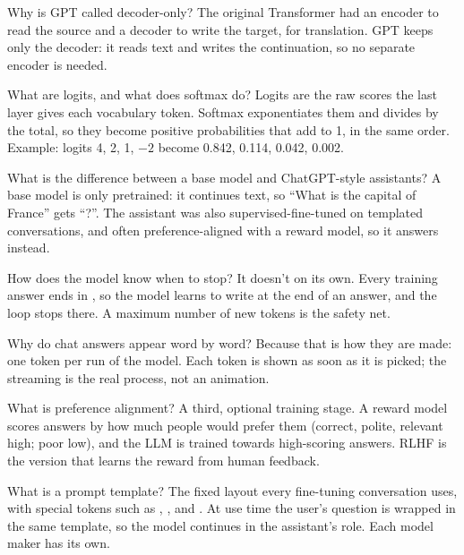 \begin{iq}[\core]{Why is GPT called decoder-only?}
The original Transformer had an encoder to read the source and a decoder to write the target, for translation. GPT keeps only the decoder: it reads text and writes the continuation, so no separate encoder is needed.
\end{iq}

\begin{iq}[\core]{What are logits, and what does softmax do?}
Logits are the raw scores the last layer gives each vocabulary token. Softmax exponentiates them and divides by the total, so they become positive probabilities that add to 1, in the same order. Example: logits 4, 2, 1, $-2$ become 0.842, 0.114, 0.042, 0.002.
\end{iq}

\begin{iq}[\core]{What is the difference between a base model and ChatGPT-style assistants?}
A base model is only pretrained: it continues text, so ``What is the capital of France'' gets ``?''. The assistant was also supervised-fine-tuned on templated conversations, and often preference-aligned with a reward model, so it answers instead.
\end{iq}

\begin{iq}{How does the model know when to stop?}
It doesn't on its own. Every training answer ends in , so the model learns to write  at the end of an answer, and the loop stops there. A maximum number of new tokens is the safety net.
\end{iq}

\begin{iq}{Why do chat answers appear word by word?}
Because that is how they are made: one token per run of the model. Each token is shown as soon as it is picked; the streaming is the real process, not an animation.
\end{iq}

\begin{iq}{What is preference alignment?}
A third, optional training stage. A reward model scores answers by how much people would prefer them (correct, polite, relevant high; poor low), and the LLM is trained towards high-scoring answers. RLHF is the version that learns the reward from human feedback.
\end{iq}

\begin{iq}{What is a prompt template?}
The fixed layout every fine-tuning conversation uses, with special tokens such as , ,  and . At use time the user's question is wrapped in the same template, so the model continues in the assistant's role. Each model maker has its own.
\end{iq}
